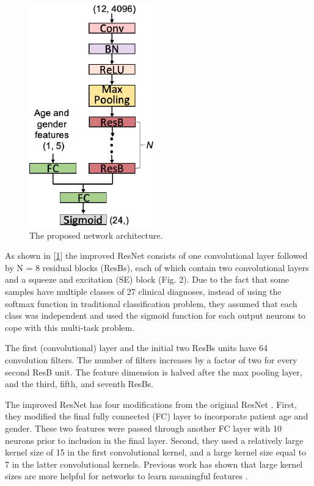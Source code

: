\begin{figure}[H]
\centering
\includegraphics[scale=0.5]{img/team_two_network.png}
\caption{The proposed network architecture.}
\label{fig:team_two_network}
\end{figure}


As shown in [\ref{fig:team_two_network}] the improved ResNet consists of one convolutional layer followed by N = 8 residual blocks (ResBs), each of which contain two convolutional layers and a squeeze and excitation (SE) block (Fig. 2). Due to the fact that some samples have multiple classes of 27 clinical diagnoses, instead of using the softmax function in traditional classification problem, they assumed that each class was independent and used the sigmoid function for each output neurons to cope with this multi-task problem.

The first (convolutional) layer and the initial two ResBs units have 64 convolution filters. The number of filters increases by a factor of two for every second ResB unit. The feature dimension is halved after the max pooling layer, and the third, fifth, and seventh ResBs.

The improved ResNet has four modifications from the original ResNet \cite{he2015delving}. First, they modified the final fully connected (FC) layer to incorporate patient age and gender. These two features were passed through another FC layer with 10 neurons prior to inclusion in the final layer. Second, they used a relatively large kernel size of 15 in the first convolutional kernel, and a large kernel size equal to 7 in the latter convolutional kernels. Previous work has shown that large kernel sizes are more helpful for networks to learn meaningful features \cite{hannun2019cardiologist}. 


